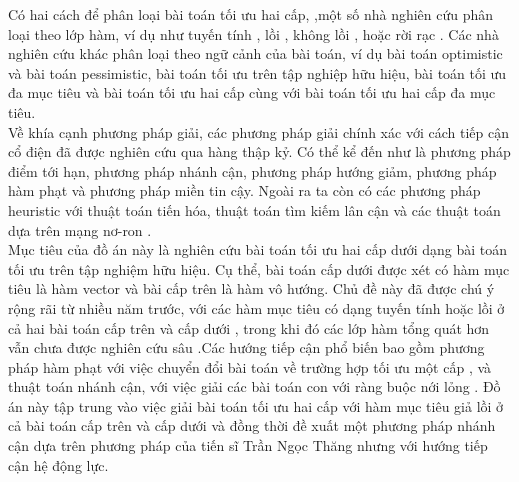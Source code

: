 \documentclass[oneside, a4paper]{book}
\theoremstyle{plain}
\theoremstyle{definition}
\theoremstyle{remark}
\begin{document}
\indent Có hai cách để phân loại bài toán tối ưu hai cấp, ,một số nhà nghiên cứu phân loại theo lớp hàm, ví dụ như tuyến tính \cite{Belkhiri2021,Muu2000,Jorge2005}, lồi \cite{Bonnel2015,Horst1999}, không lồi \cite{Lin2014,Mitsos2008}, hoặc rời rạc \cite{Alekseeva2016,Calvete2011}. Các nhà nghiên cứu khác phân loại theo ngữ cảnh của bài toán, ví dụ bài toán optimistic và bài toán pessimistic, bài toán tối ưu trên tập nghiệp hữu hiệu, bài toán tối ưu đa mục tiêu và bài toán tối ưu hai cấp cùng với bài toán tối ưu hai cấp đa mục tiêu.\\
\indent Về khía cạnh phương pháp giải, các phương pháp giải chính xác với cách tiếp cận cổ điện đã được nghiên cứu qua hàng thập kỷ. Có thể kể đến như là phương pháp điểm tới hạn, phương pháp nhánh cận, phương pháp hướng giảm, phương pháp hàm phạt và phương pháp miền tin cậy. Ngoài ra ta còn có các phương pháp heuristic với thuật toán tiến hóa, thuật toán tìm kiếm lân cận và các thuật toán dựa trên mạng nơ-ron \cite{Lu2016}.\\
\indent Mục tiêu của đồ án này là nghiên cứu bài toán tối ưu hai cấp dưới dạng bài toán tối ưu trên tập nghiệm hữu hiệu. Cụ thể, bài toán cấp dưới được xét có hàm mục tiêu là hàm vector và bài cấp trên là hàm vô hướng. Chủ đề này đã được chú ý rộng rãi từ nhiều năm trước, với các hàm mục tiêu có dạng tuyến tính hoặc lồi ở cả hai bài toán cấp trên và cấp dưới \cite{Horst2007,Le2003,Ren2016}, trong khi đó các lớp hàm tổng quát hơn vẫn chưa được nghiên cứu sâu \cite{Mitsos2008}.Các hướng tiếp cận phổ biến bao gồm phương pháp hàm phạt với việc chuyển đổi bài toán về trường hợp tối ưu một cấp \cite{White1993,Le2003}, và thuật toán nhánh cận, với việc giải các bài toán con với ràng buộc nới lỏng \cite{Belkhiri2021,Horst1999,Muu2000}. Đồ án này tập trung vào việc giải bài toán tối ưu hai cấp với hàm mục tiêu giả lồi ở cả bài toán cấp trên và cấp dưới và đồng thời đề xuất một phương pháp nhánh cận dựa trên phương pháp của tiến sĩ Trần Ngọc Thăng \cite{Thang2020} nhưng với hướng tiếp cận hệ động lực.\\
\end{document}
